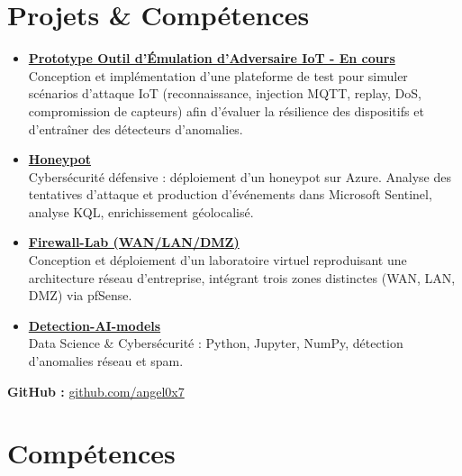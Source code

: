 \documentclass[a4paper,10pt]{article}
\begin{document}
\section*{Projets \& Compétences}


\begin{itemize}[leftmargin=*]


\item \href{https://github.com/angel0x7/IoT-Adversary-Emulator}{\textbf{Prototype Outil d'Émulation d'Adversaire IoT - En cours}} \\
Conception et implémentation d'une plateforme de test pour simuler scénarios d'attaque IoT (reconnaissance, injection MQTT, replay, DoS, compromission de capteurs) afin d'évaluer la résilience des dispositifs et d'entraîner des détecteurs d'anomalies.



  \item \href{https://github.com/angel0x7/Honeypot-}{\textbf{Honeypot}} \\
  Cybersécurité défensive : déploiement d’un honeypot sur Azure. Analyse des tentatives d’attaque et production d’événements dans Microsoft Sentinel, analyse KQL, enrichissement géolocalisé.

  \item \href{https://github.com/angel0x7/Firewall-Lab-WAN-LAN-DMZ-}{\textbf{Firewall-Lab (WAN/LAN/DMZ)}} \\
  Conception et déploiement d’un laboratoire virtuel reproduisant une architecture réseau d’entreprise, intégrant trois zones distinctes (WAN, LAN, DMZ) via pfSense.
  \item \href{https://github.com/angel0x7/Detection-AI-models-}{\textbf{Detection-AI-models}} \\
  Data Science \& Cybersécurité : Python, Jupyter, NumPy, détection d’anomalies réseau et spam.



\end{itemize}

\noindent
\textbf{GitHub :} \href{https://github.com/angel0x7}{github.com/angel0x7}


\section*{Compétences}
\end{document}
